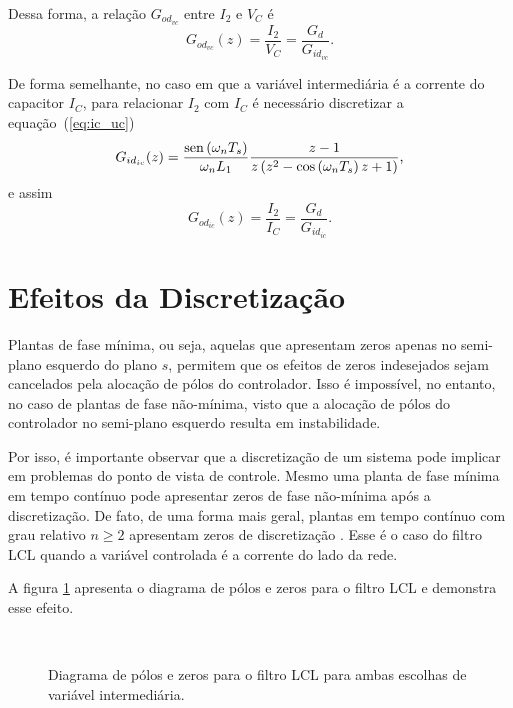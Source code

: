     Dessa forma, a relação $G_{od_{vc}}$ entre $I_2$ e $V_C$ é
    \begin{equation}
        G_{od_{vc}}(z) = \frac{I_2}{V_C} = \frac{G_d}{G_{id_{vc}}} \text{.}
        \label{eq:god_i2_vc}
    \end{equation}

    De forma semelhante, no caso em que a variável intermediária é a corrente do capacitor $I_C$, para relacionar $I_2$ com $I_C$ é necessário discretizar a equação~(\ref{eq:ic_uc})
    \begin{equation}
        G_{id_{ic}}(z) = \frac{\operatorname{sen} \left( \omega_n T_s \right)}{\omega_n L_1}
            \frac{z-1}{z \left( z^2 - \cos \left( \omega_n T_s \right) z + 1 \right)}
            \text{,}
    \end{equation}
    e assim
    \begin{equation}
        G_{od_{ic}}(z) = \frac{I_2}{I_C} = \frac{G_d}{G_{id_{ic}}} \text{.}
        \label{eq:god_i2_ic}
    \end{equation}


\section{Efeitos da Discretização}

    Plantas de fase mínima, ou seja, aquelas que apresentam zeros apenas no semi-plano esquerdo do plano $s$, permitem que os efeitos de zeros indesejados sejam cancelados pela alocação de pólos do controlador. Isso é impossível, no entanto, no caso de plantas de fase não-mínima, visto que a alocação de pólos do controlador no semi-plano esquerdo resulta em instabilidade.

    Por isso, é importante observar que a discretização de um sistema pode implicar em problemas do ponto de vista de controle. Mesmo uma planta de fase mínima em tempo contínuo pode apresentar zeros de fase não-mínima após a discretização. De fato, de uma forma mais geral, plantas em tempo contínuo com grau relativo $n \ge 2$ apresentam zeros de discretização \cite{ref:ASTROM}. Esse é o caso do filtro LCL quando a variável controlada é a corrente do lado da rede.


    A figura \ref{fig:pzmap_ic_vc} apresenta o diagrama de pólos e zeros para o filtro LCL e demonstra esse efeito.

    \begin{figure}[htb]
        \centering
        \\
        \renewcommand\figurename{Fig.}
        \caption{Diagrama de pólos e zeros para o filtro LCL para ambas escolhas de variável intermediária.}
        \label{fig:pzmap_ic_vc}
    \end{figure}


